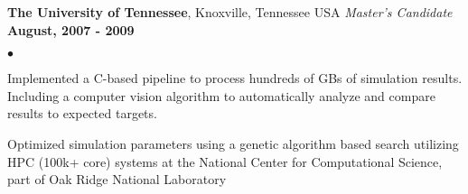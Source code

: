 \documentclass[margin,line, 11pt]{res}
\newenvironment{list2}{
  \begin{list}{$\bullet$}{%
      \setlength{\itemsep}{0in}
      \setlength{\parsep}{0in} \setlength{\parskip}{0in}
      \setlength{\topsep}{0in} \setlength{\partopsep}{0in}
      \setlength{\leftmargin}{0.2in}}}{\end{list}}
\begin{document}
\begin{resume}
\textbf{The University of Tennessee}, Knoxville, Tennessee USA\newline
\textit{Master's Candidate} \hfill \textbf{August, 2007 - 2009}\newline
    \begin{list2}
    	\vspace*{-5mm}
      \item Implemented a C-based pipeline to process hundreds of GBs of simulation results. Including a computer vision algorithm to automatically analyze and compare results to expected targets.
      \item Optimized simulation parameters using a genetic algorithm based search utilizing HPC (100k+ core) systems at the National Center for Computational Science, part of Oak Ridge National Laboratory
    \end{list2}
\vspace*{-3mm}


\end{resume}
\end{document}
